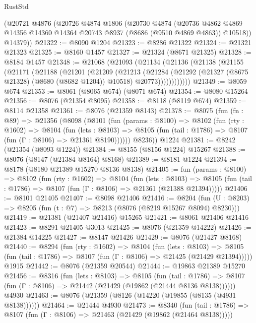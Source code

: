 \begin{lexlean}{RustStd}
\begin{coremodule}
    (@20721
      @4876
      (@20726
        @4874
        @1806
        (@20730
          @4874
          (@20736 @4862 @4869 @14356 @14360 @14364 @20743 @8937 (@8686 (@9510 @4869 @4863)) @10518))
        @14379))
@21322 := @8090 @1204
@21323 := @8286 @21322
@21324 := @21321 @21323
@21325 := @8160 @1457
@21327 := @21324 (@8671 @21325)
@21328 := @8184 @1457
@21348 := @21068
    (@21093
      (@21134
        (@21136
          (@21138
            (@21155
              (@21171
                (@21188
                  (@21201
                    (@21209
                      (@21213
                        (@21284
                          (@21292
                            (@21327 (@8675 @21328) (@8680 (@8682 @1204)) @10518)
                            @20773))))))))))))
@21349 := @8059 @674
@21353 := @8061 (@8065 @674) (@8071 @674)
@21354 := @8080 @15264
@21356 := @8076 (@21354 @8095)
@21358 := @8118 (@8119 @674)
@21359 := @8114 @21358
@21361 := @8076 (@21359 @8143)
@21378 := @8075
    (fun (fn : @89) =>
    @21356
      (@8098
        (@8101
          (fun (params : @8100) =>
          @8102
            (fun (rty : @1602) =>
            @8104
              (fun (lets : @8103) =>
              @8105 (fun (tail : @1786) => @8107 (fun (Γ : @8106) => @21361 @8190))))))
        @8236))
    @1224
@21381 := @8242 (@21354 (@8093 @1224))
@21384 := @8155 (@8156 @1224) @15267
@21388 := @8076 (@8147 (@21384 @8164) @8168)
@21389 := @8181 @1224
@21394 := @8178 (@8180 @21389 @15270 @8136 @8138)
@21405 := fun (params : @8100) =>
  @8102
    (fun (rty : @1602) =>
    @8104
      (fun (lets : @8103) =>
      @8105 (fun (tail : @1786) => @8107 (fun (Γ : @8106) => @21361 (@21388 @21394)))))
@21406 := @8101 @21405
@21407 := @8098 @21406
@21416 := @8204
    (fun (U : @8203) => @8205 (fun (t : @7) => @8213 (@8076 (@8219 @15267 @8094) @8230)))
@21419 := @21381 (@21407 @21416) @15265
@21421 := @8061 @21406 @21416
@21423 := @8291 @21405 @3013
@21425 := @8076 (@21359 @14222)
@21426 := @21384 @14225
@21427 := @8147 @21426
@21429 := @8076 (@21427 @8168)
@21440 := @8294
    (fun (rty : @1602) =>
    @8104
      (fun (lets : @8103) =>
      @8105 (fun (tail : @1786) => @8107 (fun (Γ : @8106) => @21425 (@21429 @21394)))))
    @1915
@21442 := @8076 (@21359 @20544)
@21444 := @19863 @21389 @15270
@21456 := @8316
    (fun (lets : @8103) =>
    @8105
      (fun (tail : @1786) =>
      @8107 (fun (Γ : @8106) => @21442 (@21429 (@19862 (@21444 @8136 @8138))))))
    @4930
@21463 := @8076 (@21359 (@8126 (@14220 (@19855 (@8135 (@4931 @8138))))))
@21464 := @21444 @4930
@21473 := @8340
    (fun (tail : @1786) => @8107 (fun (Γ : @8106) => @21463 (@21429 (@19862 (@21464 @8138)))))

\end{coremodule}
\end{lexlean}
